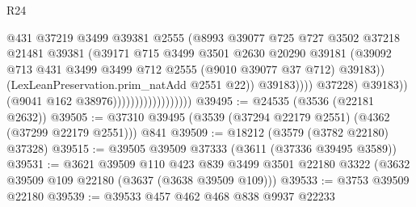 \begin{lexlean}{R24}
\begin{coremodule}
                                                    @431
                                                    @37219
                                                    @3499
                                                    @39381
                                                    @2555
                                                    (@8993
                                                      @39077
                                                      @725
                                                      @727
                                                      @3502
                                                      @37218
                                                      @21481
                                                      @39381
                                                      (@39171
                                                        @715
                                                        @3499
                                                        @3501
                                                        @2630
                                                        @20290
                                                        @39181
                                                        (@39092
                                                          @713
                                                          @431
                                                          @3499
                                                          @3499
                                                          @712
                                                          @2555
                                                          (@9010 @39077 @37 @712)
                                                          @39183))
                                                      (LexLeanPreservation.prim_natAdd @2551 @22))
                                                    @39183))))
                                            @37228)
                                          @39183))
                                      (@9041 @162 @38976))))))))))))))))))
@39495 := @24535 (@3536 (@22181 @2632))
@39505 := @37310 @39495 (@3539 (@37294 @22179 @2551) (@4362 (@37299 @22179 @2551))) @841
@39509 := @18212 (@3579 (@3782 @22180) @37328)
@39515 := @39505 @39509 @37333 (@3611 (@37336 @39495 @3589))
@39531 := @3621
    @39509
    @110
    @423
    @839
    @3499
    @3501
    @22180
    @3322
    (@3632 @39509 @109 @22180 (@3637 (@3638 @39509 @109)))
@39533 := @3753 @39509 @22180
@39539 := @39533 @457 @462 @468 @838 @9937 @22233

\end{coremodule}
\end{lexlean}
